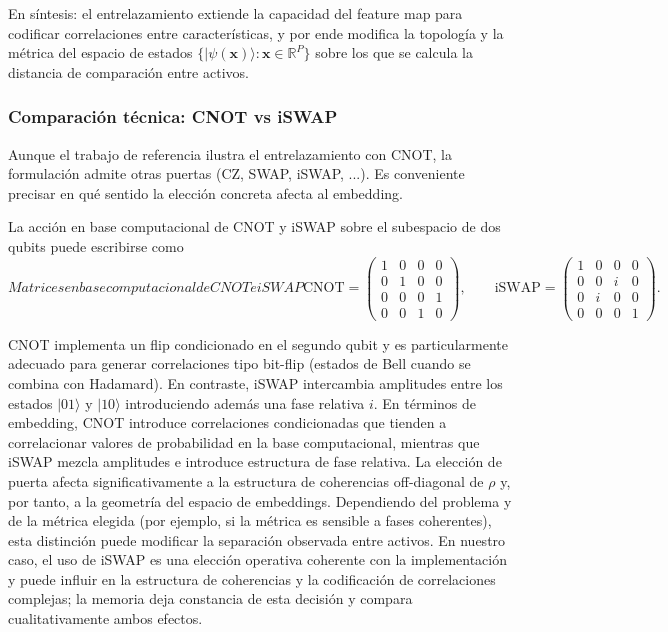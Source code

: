 En síntesis: el entrelazamiento extiende la capacidad del feature map para codificar correlaciones entre características, y por ende modifica la topología y la métrica del espacio de estados $\{\lvert\psi(\mathbf{x})\rangle : \mathbf{x}\in\mathbb{R}^P\}$ sobre los que se calcula la distancia de comparación entre activos.

\subsubsection{Comparación técnica: CNOT vs iSWAP}

Aunque el trabajo de referencia ilustra el entrelazamiento con CNOT, la formulación admite otras puertas (CZ, SWAP, iSWAP, ...). Es conveniente precisar en qué sentido la elección concreta afecta al embedding.

La acción en base computacional de CNOT y iSWAP sobre el subespacio de dos qubits puede escribirse como
\begin{equation}[eq:matrices_cnot_iswap]{Matrices en base computacional de CNOT e iSWAP}
\mathrm{CNOT} = \begin{pmatrix}1&0&0&0\\0&1&0&0\\0&0&0&1\\0&0&1&0\end{pmatrix},
\qquad
\mathrm{iSWAP} = \begin{pmatrix}1&0&0&0\\0&0&i&0\\0&i&0&0\\0&0&0&1\end{pmatrix}.
\end{equation}

CNOT implementa un flip condicionado en el segundo qubit y es particularmente adecuado para generar correlaciones tipo bit-flip (estados de Bell cuando se combina con Hadamard). En contraste, iSWAP intercambia amplitudes entre los estados $\lvert 01\rangle$ y $\lvert 10\rangle$ introduciendo además una fase relativa $i$. En términos de embedding, CNOT introduce correlaciones condicionadas que tienden a correlacionar valores de probabilidad en la base computacional, mientras que iSWAP mezcla amplitudes e introduce estructura de fase relativa. La elección de puerta afecta significativamente a la estructura de coherencias off-diagonal de $\rho$ y, por tanto, a la geometría del espacio de embeddings. Dependiendo del problema y de la métrica elegida (por ejemplo, si la métrica es sensible a fases coherentes), esta distinción puede modificar la separación observada entre activos. En nuestro caso, el uso de iSWAP es una elección operativa coherente con la implementación y puede influir en la estructura de coherencias y la codificación de correlaciones complejas; la memoria deja constancia de esta decisión y compara cualitativamente ambos efectos.

